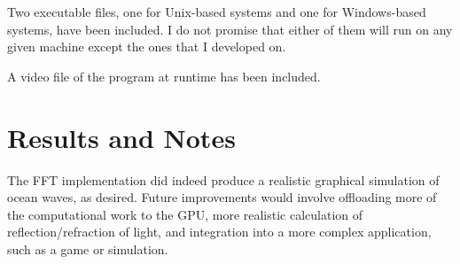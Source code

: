 \documentclass[11pt]{article} %
\begin{document}
\par Two executable files, one for Unix-based systems and one for Windows-based systems, have been included. I do not promise that either of them
will run on any given machine except the ones that I developed on.

\par A video file of the program at runtime has been included.

\section*{Results and Notes}

The FFT implementation did indeed produce a realistic graphical simulation of ocean waves, as desired. Future improvements would involve offloading more of the computational work to the GPU, more realistic calculation of reflection/refraction of light, and integration into a more complex application, such as a game or simulation.
\end{document}

